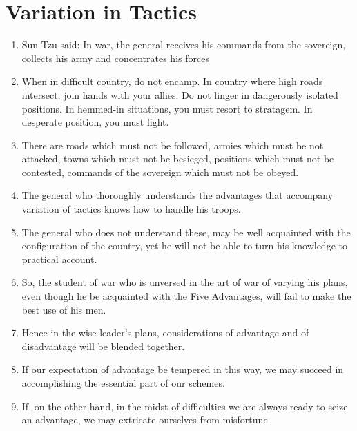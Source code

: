 \addtocounter{chapter}{1}\chapter*{Variation in Tactics}
\begin{enumerate}
\item Sun Tzu said: In war, the general receives his commands from the
  sovereign, collects his army and concentrates his forces

\item When in difficult country, do not encamp. In country where high
  roads intersect, join hands with your allies. Do not linger in
  dangerously isolated positions. In hemmed-in situations, you must
  resort to stratagem. In desperate position, you must fight.

\item There are roads which must not be followed, armies which must be
  not attacked, towns which must not be besieged, positions which must
  not be contested, commands of the sovereign which must not be
  obeyed.

\item The general who thoroughly understands the advantages that
  accompany variation of tactics knows how to handle his troops.

\item The general who does not understand these, may be well
  acquainted with the configuration of the country, yet he will not be
  able to turn his knowledge to practical account.

\item So, the student of war who is unversed in the art of war of
  varying his plans, even though he be acquainted with the Five
  Advantages, will fail to make the best use of his men.

\item Hence in the wise leader's plans, considerations of advantage
  and of disadvantage will be blended together.

\item If our expectation of advantage be tempered in this way, we may
  succeed in accomplishing the essential part of our schemes.

\item If, on the other hand, in the midst of difficulties we are
  always ready to seize an advantage, we may extricate ourselves from
  misfortune.


\end{enumerate}
